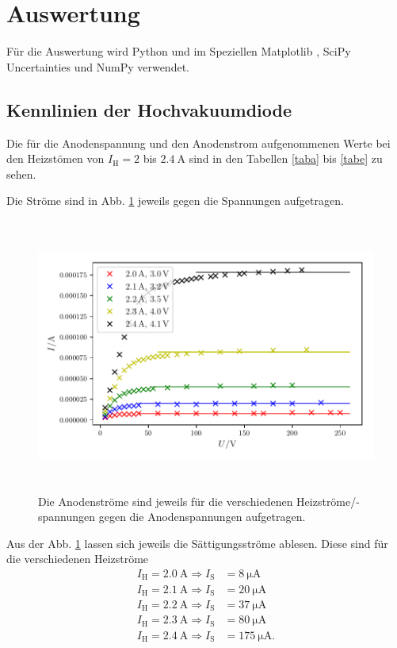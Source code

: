 \section{Auswertung}
\label{sec:Auswertung}

Für die Auswertung wird Python und im Speziellen Matplotlib \cite{matplotlib}, SciPy \cite{scipy}
Uncertainties \cite{uncertainties} und NumPy \cite{numpy}verwendet.

\subsection{Kennlinien der Hochvakuumdiode}
\label{sec:a}
Die für die Anodenspannung und den Anodenstrom aufgenommenen Werte
bei den Heizstömen von $I_\text{H} = \num{2}$ bis $\SI{2.4}{\ampere}$
sind in den Tabellen \ref{taba} bis \ref{tabe} zu sehen.







\noindent Die Ströme sind in Abb. \ref{fig:plot1} jeweils gegen die Spannungen
aufgetragen.
\begin{figure}
    \centering
    \includegraphics[width=15cm, height=9cm]{build/plot1.pdf}
    \caption{Die Anodenströme sind jeweils für die verschiedenen Heizströme/-spannungen
    gegen die Anodenspannungen aufgetragen.}
    \label{fig:plot1}
\end{figure}

\noindent Aus der Abb. \ref{fig:plot1} lassen sich jeweils
die Sättigungsströme ablesen. Diese sind für die verschiedenen
Heizströme
\begin{align*}
    I_\text{H} = \SI{2.0}{\ampere} \Rightarrow I_\text{S} &= \SI{8}{\micro\ampere} \\
    I_\text{H} = \SI{2.1}{\ampere} \Rightarrow I_\text{S} &= \SI{20}{\micro\ampere} \\
    I_\text{H} = \SI{2.2}{\ampere} \Rightarrow I_\text{S} &= \SI{37}{\micro\ampere} \\
    I_\text{H} = \SI{2.3}{\ampere} \Rightarrow I_\text{S} &= \SI{80}{\micro\ampere} \\
    I_\text{H} = \SI{2.4}{\ampere} \Rightarrow I_\text{S} &= \SI{175}{\micro\ampere}.
\end{align*}


